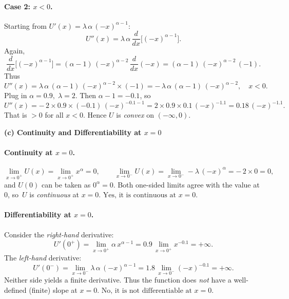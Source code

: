 \documentclass[12pt]{article}
\begin{document}
\paragraph{Case 2: \(x<0\).} 
Starting from \(U'(x) = \lambda \,\alpha\,(-x)^{\alpha - 1}\):
\[
U''(x) 
= \lambda\,\alpha \,\frac{d}{dx}\bigl[(-x)^{\alpha-1}\bigr].
\]
Again, 
\[
\frac{d}{dx}\bigl[(-x)^{\alpha-1}\bigr]
= (\alpha-1)\,(-x)^{\alpha-2}\,\frac{d}{dx}(-x) 
= (\alpha-1)\,(-x)^{\alpha-2}\,(-1).
\]
Thus
\[
U''(x) 
= \lambda\,\alpha\, (\alpha-1)\,(-x)^{\alpha-2} \times (-1)
= -\,\lambda\,\alpha\,(\alpha-1)\,(-x)^{\alpha-2}, \quad x<0.
\]
Plug in \(\alpha=0.9,\;\lambda=2\). Then \(\alpha-1=-0.1\), so
\[
U''(x) 
= -\,2 \times 0.9 \times (-0.1)\,(-x)^{-0.1-1}
= 2 \times 0.9 \times 0.1 \,(-x)^{-1.1}
= 0.18\,(-x)^{-1.1}.
\]
That is \(>0\) for all \(x<0\). Hence \(U\) is \emph{convex} on \((-\infty,0)\).

\bigskip
\noindent
\textbf{(c) Continuity and Differentiability at \(x=0\)}

\paragraph{Continuity at \(x=0\).}
\[
\lim_{x \to 0^+}U(x) = \lim_{x\to 0^+} x^\alpha = 0,\qquad
\lim_{x \to 0^-}U(x) = \lim_{x\to 0^-} -\lambda\,(-x)^\alpha = -\,2\times 0 = 0,
\]
and \(U(0)\) can be taken as \(0^\alpha = 0\). Both one-sided limits agree with the value at 0, so \(\,U\) is \emph{continuous} at \(x=0\).  
\(\boxed{\text{Yes, it is continuous at } x=0.}\)

\paragraph{Differentiability at \(x=0\).}
Consider the \emph{right-hand} derivative:
\[
U'(0^+) = \lim_{x\to 0^+} \alpha\,x^{\alpha-1} 
= 0.9 \,\lim_{x\to 0^+} x^{-0.1} 
= +\infty.
\]
The \emph{left-hand} derivative:
\[
U'(0^-) 
= \lim_{x\to 0^-} \lambda\,\alpha\,(-x)^{\alpha-1}
= 1.8 \,\lim_{x\to 0^-} (-x)^{-0.1}
= +\infty.
\]
Neither side yields a finite derivative. Thus the function does \emph{not} have a well-defined (finite) slope at \(x=0\).  
\(\boxed{\text{No, it is not differentiable at }x=0.}\)
\end{document}
